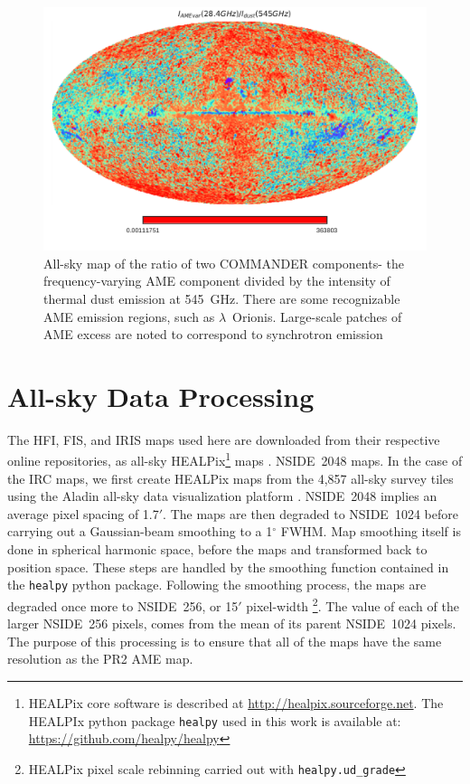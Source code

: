           \begin{figure}
               \centering
               \includegraphics[width=\textwidth]{../Plots/ch_datasources/R_PCAMEtoPCRad.pdf}
               \caption{All-sky map of the ratio of two COMMANDER components- the frequency-varying AME component divided by the intensity of thermal dust emission at 545~GHz. There are some recognizable AME emission regions, such as $\lambda$~Orionis. Large-scale patches of AME excess are noted to correspond to synchrotron emission \citep{hensley16}}
               \label{fig:R_PCAMEtoPCdust}
           \end{figure}

  \section{All-sky Data Processing}

        The HFI, FIS, and IRIS maps used here are downloaded from their respective online repositories, as all-sky HEALPix\footnote{HEALPix core software is described at \url{http://healpix.sourceforge.net}. The HEALPIx python package {\tt healpy} used in this work is available at: \url{https://github.com/healpy/healpy}} maps \citep{gorski05}.   NSIDE~2048 maps. In the case of the IRC maps, we first create HEALPix maps from the 4,857 all-sky survey tiles using the Aladin all-sky data visualization platform \citep{bonnarel00}. NSIDE~2048 implies an average pixel spacing of 1.7$'$. The maps are then degraded to NSIDE~1024 before carrying out a Gaussian-beam smoothing to a 1$^{\circ}$ FWHM. Map smoothing itself is done in spherical harmonic space, before the maps and transformed back to position space. These steps are handled by the smoothing function contained in the {\tt healpy} python package. Following the smoothing process, the maps are degraded once more to NSIDE~256, or 15$'$ pixel-width \footnote{HEALPix pixel scale rebinning carried out with {\tt healpy.ud\_grade}}. The value of each of the larger NSIDE~256 pixels, comes from the mean of its parent NSIDE~1024 pixels. The purpose of this processing is to ensure that all of the maps have the same resolution as the PR2 AME map.
